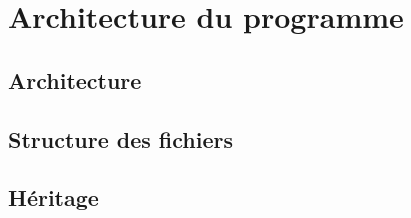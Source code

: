 \section{Architecture du programme}

\subsection{Architecture}


\subsection{Structure des fichiers}


\subsection{Héritage}
